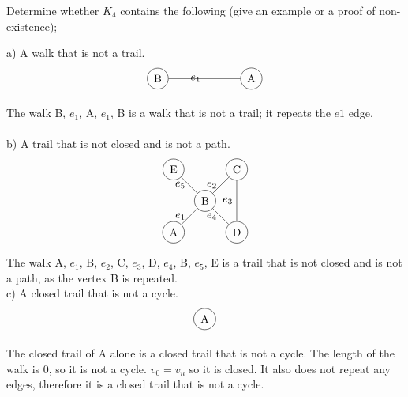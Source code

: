 \documentclass[12pt]{article}
\newenvironment{question}[2][Question]{\begin{trivlist}
\item[\hskip \labelsep {\bfseries #1}\hskip \labelsep {\bfseries #2.}]}{\end{trivlist}}
\begin{document}
\begin{question}{6}
Determine whether $K_4$ contains the following (give an example or a proof of non-existence);
\end{question}
a) A walk that is not a trail. \\
\begin{align*}
\begin{tikzpicture}
    \node[shape=circle,draw=black] (A) at (3,0) {A};
    \node[shape=circle,draw=black] (B) at (0,0) {B};
    \path [] (A) edge node[left] {$e_1$} (B);
\end{tikzpicture}
\end{align*}

The walk B, $e_1$, A, $e_1$, B is a walk that is not a trail; it repeats the $e1$ edge.\\ \\
b) A trail that is not closed and is not a path. \\
\begin{align*}
\begin{tikzpicture}
    \node[shape=circle,draw=black] (A) at (0,0) {A};
    \node[shape=circle,draw=black] (B) at (1,1) {B};
    \node[shape=circle,draw=black] (C) at (2,2) {C};
    \node[shape=circle,draw=black] (D) at (2,0) {D};
    \node[shape=circle,draw=black] (E) at (0,2) {E};
    \path [] (A) edge node[left] {$e_1$} (B);
    \path [] (B) edge node[left] {$e_2$} (C);
    \path [] (C) edge node[left] {$e_3$} (D);
    \path [] (D) edge node[left] {$e_4$} (B);
    \path [] (B) edge node[left] {$e_5$} (E);
\end{tikzpicture}
\end{align*}
The walk A, $e_1$, B, $e_2$, C, $e_3$, D, $e_4$, B, $e_5$, E is a trail that is not closed and is not a path, as the vertex B is repeated. \\

c) A closed trail that is not a cycle. \\
\begin{align*}
\begin{tikzpicture}
    \node[shape=circle,draw=black] (A) at (0,0) {A};
\end{tikzpicture}
\end{align*}

The closed trail of A alone is a closed trail that is not a cycle. The length of the walk is 0, so it is not a cycle. $v_0 = v_n$ so it is closed. It also does not repeat any edges, therefore it is a closed trail that is not a cycle.\\
\end{document}
